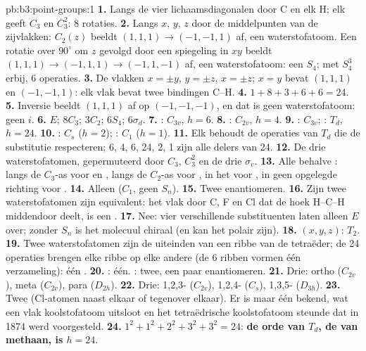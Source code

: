 \begin{solution}{pb:b3:point-groups:1}
\textbf{1.} Langs de vier lichaamsdiagonalen door C en elk H; elk geeft
$C_3$ en $C_3^2$: 8 rotaties.
\textbf{2.} Langs $x$, $y$, $z$ door de middelpunten van de zijvlakken: $C_2(z)$ beeldt $(1,1,1)
\to (-1,-1,1)$ af, een waterstofatoom. Een rotatie over $90^\circ$ om $z$
gevolgd door een spiegeling in $xy$ beeldt $(1,1,1) \to (-1,1,1) \to (-1,1,-1)$ af, een
waterstofatoom: een
$S_4$; met $S_4^3$ erbij, 6 operaties.
\textbf{3.} De vlakken $x = \pm y$, $y = \pm z$, $x = \pm z$; $x = y$ bevat
$(1,1,1)$ en $(-1,-1,1)$: elk vlak bevat twee bindingen C--H.
\textbf{4.} $1 + 8 + 3 + 6 + 6 = 24$.
\textbf{5.} Inversie beeldt $(1,1,1)$ af op $(-1,-1,-1)$, en dat is geen
waterstofatoom: geen $i$.
\textbf{6.} $E$; $8C_3$; $3C_2$; $6S_4$; $6\sigma_d$.
\textbf{7.} : $C_{3v}$, $h = 6$.
\textbf{8.} : $C_{2v}$, $h = 4$.
\textbf{9.} : $C_{3v}$; : $T_d$, $h = 24$.
\textbf{10.} : $C_s$ ($h = 2$); : $C_1$ ($h = 1$).
\textbf{11.} Elk behoudt de operaties van $T_d$ die de substitutie
respecteren; 6, 4, 6, 24, 2, 1 zijn alle delers van 24.
\textbf{12.} De drie waterstofatomen, gepermuteerd door $C_3$, $C_3^2$ en de
drie $\sigma_v$.
\textbf{13.} Alle behalve : langs de $C_3$-as voor  en
, langs de $C_2$-as voor , in het  voor
, in geen opgelegde richting voor .
\textbf{14.} Alleen  ($C_1$, geen $S_n$).
\textbf{15.} Twee enantiomeren.
\textbf{16.} Zijn twee waterstofatomen zijn equivalent: het vlak door C, F
en Cl dat de hoek H--C--H middendoor deelt, is een .
\textbf{17.} Nee: vier verschillende substituenten laten alleen $E$ over;
zonder $S_n$ is het molecuul chiraal (en kan het polair zijn).
\textbf{18.} $(x, y, z)$: $T_2$.
\textbf{19.} Twee waterstofatomen zijn de uiteinden van een ribbe van de
tetraëder; de 24 operaties brengen elke ribbe op elke andere (de 6 ribben
vormen één verzameling): één .
\textbf{20.} : één. : twee, een paar enantiomeren.
\textbf{21.} Drie: ortho ($C_{2v}$), meta ($C_{2v}$), para ($D_{2h}$).
\textbf{22.} Drie: 1,2,3- ($C_{2v}$), 1,2,4- ($C_s$), 1,3,5- ($D_{3h}$).
\textbf{23.} Twee (Cl-atomen naast elkaar of tegenover elkaar). Er is maar
één  bekend, wat een vlak koolstofatoom uitsloot en het
tetraëdrische koolstofatoom steunde dat in 1874 werd voorgesteld.
\textbf{24.} $1^2 + 1^2 + 2^2 + 3^2 + 3^2 = 24$: \textbf{de orde van $T_d$, de
 van methaan, is $h = 24$}.
\end{solution}
